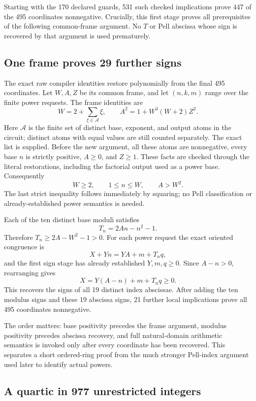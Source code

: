 Starting with the 170 declared guards, 531 such checked implications
prove 447 of the 495 coordinates nonnegative.  Crucially, this first
stage proves all prerequisites of the following common-frame argument.
No $T$ or Pell abscissa whose sign is recovered by that argument is used
prematurely.

\subsection{One frame proves 29 further signs}

The exact raw compiler identities restore polynomially from the final
495 coordinates.  Let $W,A,Z$ be its common frame, and let
$(n,k,m)$ range over the finite power requests.  The frame identities are
\[
 W=2+\sum_{\xi\in\mathcal A}\xi,\qquad
 A^2=1+W^3(W+2)Z^2.
\]
Here $\mathcal A$ is the finite set of distinct base, exponent, and output
atoms in the circuit; distinct atoms with equal values are still counted
separately.  The exact list is supplied.  Before the new argument,
all these atoms are nonnegative, every base $n$ is strictly positive,
$A\ge0$, and $Z\ge1$.  These facts are checked through the literal
restorations, including the factorial output used as a power base.
Consequently
\[
 W\ge2,\qquad 1\le n\le W,\qquad A>W^2.
\]
The last strict inequality follows immediately by squaring; no Pell
classification or already-established power semantics is needed.

Each of the ten distinct base moduli satisfies
\[
 T_n=2An-n^2-1.
\]
Therefore $T_n\ge2A-W^2-1>0$.  For each power request the exact oriented
congruence is
\[
 X+Yn=YA+m+T_nq,
\]
and the first sign stage has already established $Y,m,q\ge0$.
Since $A-n>0$, rearranging gives
\[
 X=Y(A-n)+m+T_nq\ge0.
\]
This recovers the signs of all 19 distinct index abscissae.  After adding
the ten modulus signs and these 19 abscissa signs, 21 further local
implications prove all 495 coordinates nonnegative.

The order matters: base positivity precedes the frame argument, modulus
positivity precedes abscissa recovery, and full natural-domain arithmetic
semantics is invoked only after every coordinate has been recovered.
This separates a short ordered-ring proof from the much stronger
Pell-index argument used later to identify actual powers.

\subsection{A quartic in 977 unrestricted integers}


